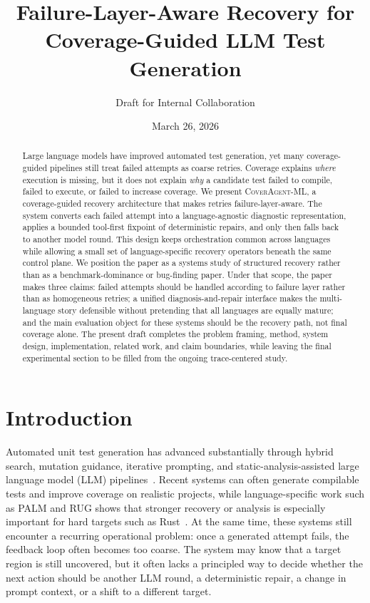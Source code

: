 \documentclass[10pt]{article}
\title{Failure-Layer-Aware Recovery for Coverage-Guided LLM Test Generation}
\author{Draft for Internal Collaboration}
\date{March 26, 2026}
\begin{document}
\maketitle

\begin{abstract}
Large language models have improved automated test generation, yet many coverage-guided pipelines still treat failed attempts as coarse retries. Coverage explains \emph{where} execution is missing, but it does not explain \emph{why} a candidate test failed to compile, failed to execute, or failed to increase coverage. We present \textsc{CoverAgent-ML}, a coverage-guided recovery architecture that makes retries failure-layer-aware. The system converts each failed attempt into a language-agnostic diagnostic representation, applies a bounded tool-first fixpoint of deterministic repairs, and only then falls back to another model round. This design keeps orchestration common across languages while allowing a small set of language-specific recovery operators beneath the same control plane. We position the paper as a systems study of structured recovery rather than as a benchmark-dominance or bug-finding paper. Under that scope, the paper makes three claims: failed attempts should be handled according to failure layer rather than as homogeneous retries; a unified diagnosis-and-repair interface makes the multi-language story defensible without pretending that all languages are equally mature; and the main evaluation object for these systems should be the recovery path, not final coverage alone. The present draft completes the problem framing, method, system design, implementation, related work, and claim boundaries, while leaving the final experimental section to be filled from the ongoing trace-centered study.
\end{abstract}

\section{Introduction}

Automated unit test generation has advanced substantially through hybrid search, mutation guidance, iterative prompting, and static-analysis-assisted large language model (LLM) pipelines~\cite{lemieux2023codamosa,pizzorno2025coverup,alshahwan2024testgenllm,pan2024aster,chu2025palm,gu2025panta}. Recent systems can often generate compilable tests and improve coverage on realistic projects, while language-specific work such as PALM and RUG shows that stronger recovery or analysis is especially important for hard targets such as Rust~\cite{chu2025palm,cheng2025rug}. At the same time, these systems still encounter a recurring operational problem: once a generated attempt fails, the feedback loop often becomes too coarse. The system may know that a target region is still uncovered, but it often lacks a principled way to decide whether the next action should be another LLM round, a deterministic repair, a change in prompt context, or a shift to a different target.
\end{document}
